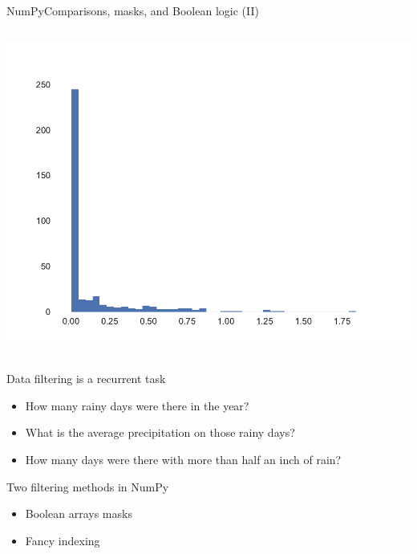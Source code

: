 \documentclass[10pt,compress]{beamer} %
\begin{document}
\begin{frame}[fragile]{NumPy}{Comparisons, masks, and Boolean logic (II)}
	\begin{columns}
		\includegraphics[width=\textwidth]{figs/rain.pdf}	
	\end{columns}

	Data filtering is a recurrent task
	\begin{itemize}
		\item How many rainy days were there in the year?
		\item What is the average precipitation on those rainy days?
		\item How many days were there with more than half an inch of rain?
	\end{itemize}

	Two filtering methods in NumPy
	\begin{itemize}
		\item Boolean arrays masks
		\item Fancy indexing
	\end{itemize}
\end{frame}
\end{document}
